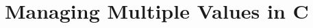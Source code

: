 \clearpage
\def\pageLang{c}
\section{Managing Multiple Values in C} %
\label{sec:arrays_in_c}








